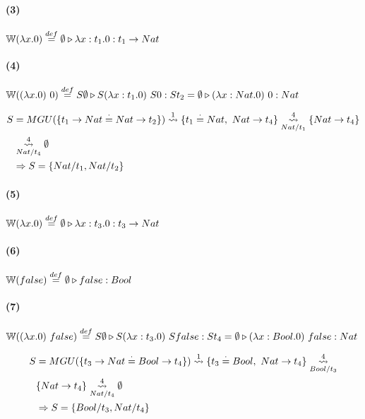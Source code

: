 \documentclass[10pt,a4paper]{article}
\begin{document}
\paragraph{(3)} $\WFunc(\lambdaAbsI{x}{0}) \equalDef \judgeType{\emptyset}{\lambdaAbs{x}{t_1}{0}}{t_1\to Nat}$

\paragraph{(4)} $\WFunc((\lambdaAbsI{x}{0})~0) \equalDef \judgeType{S\emptyset}{S(\lambdaAbs{x}{t_1}{0})~S0}{St_2} = \judgeType{\emptyset}{(\lambdaAbs{x}{Nat}{0})~0}{Nat}$

\begin{centrado}
\begin{align*}
S &= MGU(\{t_1\to Nat \equalDot Nat\to t_2\}) \goesTo{1}{} \{t_1\equalDot Nat,~ Nat \to t_4\} \goesTo{4}{Nat/t_1} \{Nat \to t_4\} \\
&\goesTo{4}{Nat/t_4} \emptyset \\
&\Rightarrow S=\{Nat/t_1, Nat/t_2\}
\end{align*}
\end{centrado}

\vspace*{5mm}
\begin{multicols}{2}
\paragraph{(5)} $\WFunc(\lambdaAbsI{x}{0}) \equalDef \judgeType{\emptyset}{\lambdaAbs{x}{t_3}{0}}{t_3\to Nat}$

\paragraph{(6)} $\WFunc(false) \equalDef \judgeType{\emptyset}{false}{Bool}$
\end{multicols}


\paragraph{(7)} $\WFunc((\lambdaAbsI{x}{0})~false) \equalDef \judgeType{S\emptyset}{S(\lambdaAbs{x}{t_3}{0})~Sfalse}{St_4} = \judgeType{\emptyset}{(\lambdaAbs{x}{Bool}{0})~false}{Nat}$

\begin{centrado}
\begin{align*}
S &= MGU(\{t_3\to Nat \equalDot Bool\to t_4\}) \goesTo{1}{} \{t_3\equalDot Bool,~ Nat \to t_4\} \goesTo{4}{Bool/t_3} \\
&\{Nat \to t_4\} \goesTo{4}{Nat/t_4} \emptyset \\
&\Rightarrow S=\{Bool/t_3, Nat/t_4\}
\end{align*}
\end{centrado}
\end{document}
